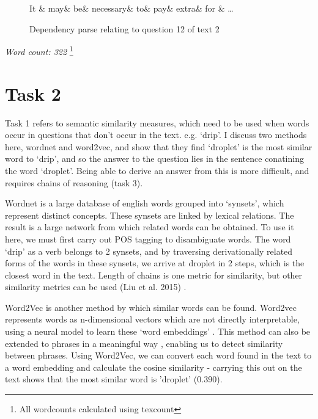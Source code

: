 \documentclass[12pt,a4paper]{article}
\begin{document}
\begin{figure}
\centering
\begin{dependency}
    \begin{deptext}[column sep=1em]
        It \& may\& be\& necessary\& to\& pay\& extra\& for \& \dots \\
    \end{deptext}
\end{dependency}
\caption{Dependency parse relating to question 12 of text 2}
\label{fig:deps-q2_2}

\end{figure}

\textit{Word count: 322} \footnote{All wordcounts calculated using texcount}

\section*{Task 2}

Task 1 refers to semantic similarity measures, which need to be used when words occur in questions that don't occur in the text. e.g. `drip'. I discuss two methods here, wordnet and word2vec, and show that they find `droplet' is the most similar word to `drip', and so the answer to the question lies in the sentence conatining the word `droplet'. Being able to derive an answer from this is more difficult, and requires chains of reasoning (task 3).

Wordnet is a large database of english words grouped into `synsets', which represent distinct concepts. These synsets are linked by lexical relations\cite{nlp_lec7}. The result is a large network from which related words can be obtained. To use it here, we must first carry out POS tagging \cite{NLP_lec2} to disambiguate words. The word `drip' as a verb belongs to 2 synsets, and by traversing derivationally related forms of the words in these synsets, we arrive at droplet in 2 steps, which is the closest word in the text. Length of chains is one metric for similarity, but other similarity metrics can be used (Liu et al. 2015) \cite{wn_sim}.

Word2Vec\cite{DBLP:journals/corr/LeM14} is another method by which similar words can be found. Word2vec represents words as n-dimensional vectors which are not directly interpretable, using a neural model to learn these `word embeddings' \cite{nlp_lec8}. This method can also be extended to phrases in a meaningful way \cite{mikolov2013distributed}, enabling us to detect similarity between phrases. Using Word2Vec, we can convert each word found in the text to a word embedding and calculate the cosine similarity - carrying this out on the text shows that the most similar word is 'droplet' (0.390).
\end{document}
